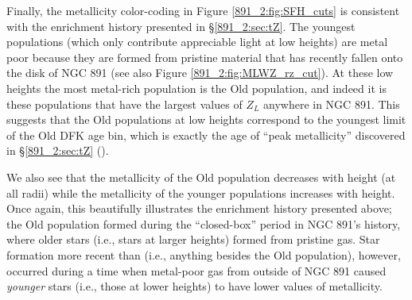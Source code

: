 

Finally, the metallicity color-coding in Figure
\ref{891_2:fig:SFH_cuts} is consistent with the enrichment history
presented in \S\ref{891_2:sec:tZ}. The youngest populations (which
only contribute appreciable light at low heights) are metal poor
because they are formed from pristine material that has recently
fallen onto the disk of NGC 891 (see also Figure
\ref{891_2:fig:MLWZ_rz_cut}). At these low heights the most metal-rich
population is the Old population, and indeed it is these populations
that have the largest values of $Z_L$ anywhere in NGC 891. This
suggests that the Old populations at low heights correspond to the
youngest limit of the Old DFK age bin, which is exactly the age of
``peak metallicity'' discovered in \S\ref{891_2:sec:tZ} ().

We also see that the metallicity of the Old population decreases with
height (at all radii) while the metallicity of the younger populations
increases with height. Once again, this beautifully illustrates the
enrichment history presented above; the Old population formed during
the ``closed-box'' period in NGC 891's history, where older stars
(i.e., stars at larger heights) formed from pristine gas. Star
formation more recent than  (i.e., anything besides the
Old population), however, occurred during a time when metal-poor gas
from outside of NGC 891 caused \emph{younger} stars (i.e., those at
lower heights) to have lower values of metallicity.



